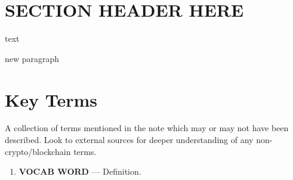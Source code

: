 \documentclass[full.tex]{subfiles}
\begin{document}
    \thispagestyle{firstpage}
    \vspace*{2\baselineskip}
    \section*{SECTION HEADER HERE}
    text
    
    new paragraph
    
    \newpage
    \thispagestyle{firstpage}
    \vspace*{2\baselineskip}
    \section*{Key Terms}
    \noindent A collection of terms mentioned in the note which may or may not have been described. Look to external sources for deeper understanding of any non-crypto/blockchain terms.
    \begin{enumerate}
        \item \textbf{VOCAB WORD} --- Definition. %
    \end{enumerate}
\end{document}
